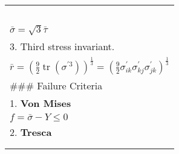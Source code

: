 \begin{longtable}[]{@{}l@{}}
\begin{minipage}[t]{0.47\columnwidth}
\end{minipage}\tabularnewline
\begin{minipage}[t]{0.47\columnwidth}\raggedright
\(\bar{\sigma}=\sqrt{\frac{3}{2}}\left|\sigma^{\prime}\right|=\sqrt{\frac{3}{2} \operatorname{tr}\left(\sigma^{\prime 2}\right)}=\sqrt{\frac{3}{2} \sigma_{i j}^{\prime} \sigma_{i j}^{\prime}}\\\)\strut
\end{minipage}\tabularnewline
\begin{minipage}[t]{0.47\columnwidth}\raggedright
\(\bar{\sigma}=\left[\frac{1}{2}\left(\left(\sigma_{11}-\sigma_{22}\right)^{2}+\left(\sigma_{22}-\sigma_{33}\right)^{2}+\left(\sigma_{33}-\sigma_{11}\right)^{2}\right)+3\left(\sigma_{12}^{2}+\sigma_{23}^{2}+\sigma_{31}^{2}\right)\right]^{1 / 2}\\\)\strut
\end{minipage}\tabularnewline
\begin{minipage}[t]{0.47\columnwidth}\raggedright
\(\bar{\sigma}=\sqrt{3} \bar{\tau}\)\strut
\end{minipage}\tabularnewline
\begin{minipage}[t]{0.47\columnwidth}\raggedright
3. Third stress invariant.\strut
\end{minipage}\tabularnewline
\begin{minipage}[t]{0.47\columnwidth}\raggedright
\(\bar{r}=\left(\frac{9}{2} \operatorname{tr}\left(\sigma^{\prime 3}\right)\right)^{\frac{1}{3}}=\left(\frac{9}{2} \sigma_{i k}^{\prime} \sigma_{k j}^{\prime} \sigma_{j k}^{\prime}\right)^{\frac{1}{3}}\)\strut
\end{minipage}\tabularnewline
\begin{minipage}[t]{0.47\columnwidth}\raggedright
\#\#\# Failure Criteria\strut
\end{minipage}\tabularnewline
\begin{minipage}[t]{0.47\columnwidth}\raggedright
1. \textbf{Von Mises}\strut
\end{minipage}\tabularnewline
\begin{minipage}[t]{0.47\columnwidth}\raggedright
\(f = \bar{\sigma} - Y \leq 0\)\strut
\end{minipage}\tabularnewline
\begin{minipage}[t]{0.47\columnwidth}\raggedright
2. \textbf{Tresca}\strut
\end{minipage}\tabularnewline
\begin{minipage}[t]{0.47\columnwidth}\raggedright
\(f = \left(\sigma_{1}-\sigma_{3}\right) \leq Y\)\\

\end{minipage}
\end{longtable}
